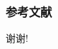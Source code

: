 \documentclass{beamer}
\begin{document}
\begin{frame}
  \frametitle{参考文献}
  \printbibliography
\end{frame}

\begin{frame}
\Huge{\centerline{谢谢!}}
\end{frame}

\end{document}
